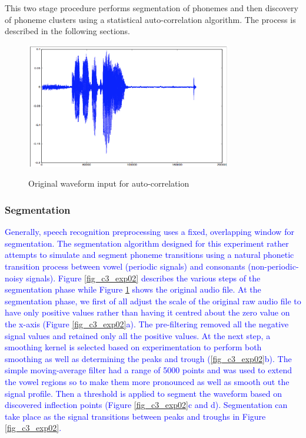 This two stage procedure performs segmentation of phonemes and then discovery of phoneme clusters using a statistical auto-correlation algorithm.  The process is described in the following sections.
\begin{figure}
\centering
  \includegraphics[width=9cm]{thesis/images/corr}\\
  \caption{Original waveform input for auto-correlation}\label{fig_c3_exp01}
\end{figure}

\subsubsection{Segmentation}
\textcolor{blue}{Generally, speech recognition preprocessing uses a fixed, overlapping window for segmentation. The segmentation algorithm designed for this experiment rather attempts to simulate and segment phoneme transitions using a natural phonetic  transition process between vowel (periodic signals) and consonants (non-periodic-noisy signals). Figure \ref{fig_c3_exp02} describes the various steps of the segmentation phase while Figure \ref{fig_c3_exp01} shows the original audio file. At the segmentation phase, we first of all adjust the scale of the original raw audio file to have only positive values rather than having it centred about the zero value on the x-axis (Figure \ref{fig_c3_exp02}a).  The pre-filtering removed all the negative signal values and retained only all the positive values.  At the next step, a smoothing kernel is selected based on experimentation to perform both smoothing as well as determining the peaks and trough (\ref{fig_c3_exp02}b).  The simple moving-average filter had a range of 5000 points and was used to extend the vowel regions so to make them more pronounced as well as smooth out the signal profile.    Then a threshold is applied to segment the waveform based on discovered inflection points (Figure \ref{fig_c3_exp02}c and d).  Segmentation can take place as the signal transitions between peaks and troughs in Figure \ref{fig_c3_exp02}.}

